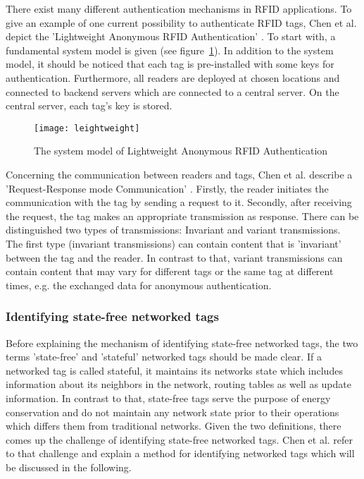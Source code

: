 There exist many different authentication mechanisms in RFID applications. To give an example of one current possibility to authenticate RFID tags, Chen et al. depict the 'Lightweight Anonymous RFID Authentication' \cite[p.39 ff.]{chen}. To start with, a fundamental system model is given (see figure~\ref{fig:lightweight}). In addition to the system model, it should be noticed that each tag is pre-installed with some keys for authentication. Furthermore, all readers are deployed at chosen locations and connected to backend servers which are connected to a central server. On the central server, each tag's key is stored.

\begin{figure}
\centering
\texttt{[image: leightweight]} 
\caption{\label{fig:lightweight} The system model of Lightweight Anonymous RFID Authentication \cite[p.40]{chen}} 
\end{figure}

Concerning the communication between readers and tags, Chen et al. describe a 'Request-Response mode Communication' \cite[p.40 ff.]{chen}. Firstly, the reader initiates the communication with the tag by sending a request to it. Secondly, after receiving the request, the tag makes an appropriate transmission as response. There can be distinguished two types of transmissions: Invariant and variant transmissions. The first type (invariant transmissions) can contain content that is 'invariant' between the tag and the reader. In contrast to that, variant transmissions can contain content that may vary for different tags or the same tag at different times, e.g. the exchanged data for anonymous authentication.  

\subsubsection{Identifying state-free networked tags}

Before explaining the mechanism of identifying state-free networked tags, the two terms 'state-free' and 'stateful' networked tags should be made clear. If a networked tag is called stateful, it maintains its networks state which includes information about its neighbors in the network, routing tables as well as update information. In contrast to that, state-free tags serve the purpose of energy conservation and do not maintain any network state prior to their operations which differs them from traditional networks. 
Given the two definitions, there comes up the challenge of identifying state-free networked tags. Chen et al. refer to that challenge and explain a method for identifying networked tags \cite[p.67 ff.]{chen} which will be discussed in the following. 


